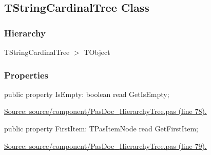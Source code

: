\documentclass{report}
\newif\ifpdf
\begin{document}
\subsection*{TStringCardinalTree Class}
\fi
\label{PasDoc_HierarchyTree.TStringCardinalTree}
\subsubsection*{\large{\textbf{Hierarchy}}\normalsize\hspace{1ex}\hfill}
TStringCardinalTree {$>$} TObject
\subsubsection*{\large{\textbf{Properties}}\normalsize\hspace{1ex}\hfill}
\begin{list}{}{
\setlength{\itemindent}{0cm}
\setlength{\listparindent}{0cm}
\setlength{\leftmargin}{\evensidemargin}
\addtolength{\leftmargin}{\tmplength}
\settowidth{\labelsep}{X}
\addtolength{\leftmargin}{\labelsep}
\setlength{\labelwidth}{\tmplength}
}
\label{PasDoc_HierarchyTree.TStringCardinalTree-IsEmpty}
\item[\textbf{IsEmpty}\hfill]
\ifpdf
\begin{flushleft}
\fi
\begin{ttfamily}
public property IsEmpty: boolean read GetIsEmpty;\end{ttfamily}

\ifpdf
\end{flushleft}
\fi


\par  \par
\href{https://github.com/pasdoc/pasdoc/blob/master/source/component/PasDoc_HierarchyTree.pas#L78}{Source: source/component/PasDoc{\_}HierarchyTree.pas (line 78).}\label{PasDoc_HierarchyTree.TStringCardinalTree-FirstItem}
\item[\textbf{FirstItem}\hfill]
\ifpdf
\begin{flushleft}
\fi
\begin{ttfamily}
public property FirstItem: TPasItemNode read GetFirstItem;\end{ttfamily}

\ifpdf
\end{flushleft}
\fi


\par  \par
\href{https://github.com/pasdoc/pasdoc/blob/master/source/component/PasDoc_HierarchyTree.pas#L79}{Source: source/component/PasDoc{\_}HierarchyTree.pas (line 79).}\end{list}
\end{document}
